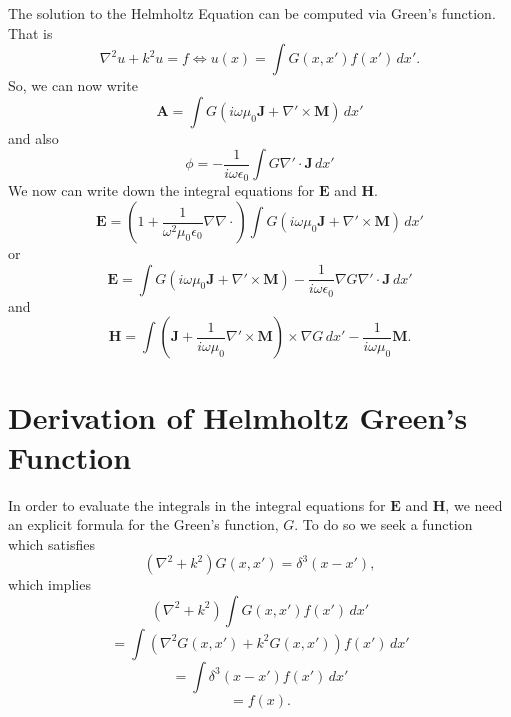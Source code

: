 \documentclass{article}
\newcommand{\Div}[0]{\nabla\cdot}
\newcommand{\pDiv}[0]{\nabla'\cdot}
\newcommand{\pCurl}[0]{\nabla'\times}
\theoremstyle{plain}
\begin{document}
The solution to the Helmholtz Equation can be computed via Green's function.
That is
\begin{equation}
	\nabla^2u + k^2u = f
	\Leftrightarrow
	u(x) = \int G(x,x')f(x') \,dx'.
\end{equation}
So, we can now write
\begin{equation}
	\mathbf{A} = \int G\left( i\omega\mu_0\mathbf{J} + \pCurl\mathbf{M} \right) \,dx'
\end{equation}
and also
\begin{equation}
	\phi = -\frac{1}{i\omega\epsilon_0} \int G \pDiv\mathbf{J} \,dx'
\end{equation}
We now can write down the integral equations for $\mathbf{E}$ and $\mathbf{H}$.
\begin{equation}
	\mathbf{E} =
	\left(1 + \frac{1}{\omega^2\mu_0\epsilon_0}\nabla\Div\right)
	\int G\left( i\omega\mu_0\mathbf{J} + \pCurl\mathbf{M} \right) \,dx'
\end{equation}
or
\begin{equation}
	\mathbf{E} =
	\int G\left( i\omega\mu_0\mathbf{J} + \pCurl\mathbf{M} \right)
	- \frac{1}{i\omega\epsilon_0} \nabla G \pDiv\mathbf{J} \,dx'
\end{equation}
and
\begin{equation}
	\mathbf{H} = 
	\int  \left( \mathbf{J} + \frac{1}{i\omega\mu_0}\pCurl\mathbf{M} \right) \times \nabla G \,dx'
	-\frac{1}{i\omega\mu_0}\mathbf{M}.
\end{equation}



\section{Derivation of Helmholtz Green's Function}

In order to evaluate the integrals in the integral equations for $\mathbf{E}$ and $\mathbf{H}$,
we need an explicit formula for the Green's function, $G$.
To do so we seek a function which satisfies
\begin{equation}
	\left( \nabla^2 + k^2 \right)G(x,x') = \delta^3(x-x'),
\end{equation}
which implies
\begin{equation*}
	\left( \nabla^2 + k^2 \right)
	\int G(x,x')f(x') \,dx'
\end{equation*}
\begin{equation*}
	= \int \left( \nabla^2G(x,x') + k^2G(x,x') \right)
	f(x') \,dx'
\end{equation*}
\begin{equation*}
	= \int \delta^3(x-x')f(x') \,dx'
\end{equation*}
\begin{equation}
	= f(x).
\end{equation}
\end{document}
